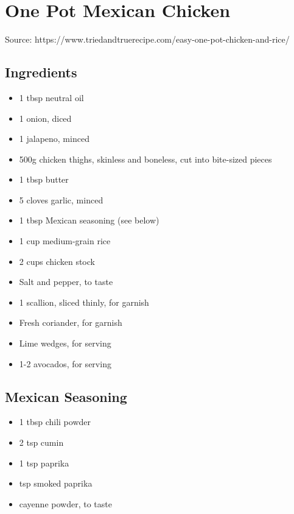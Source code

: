 \clearpage
\section{One Pot Mexican Chicken}


Source: https://www.triedandtruerecipe.com/easy-one-pot-chicken-and-rice/

\subsection{Ingredients}

\begin{itemize}
    \item 1 tbsp neutral oil
    \item 1 onion, diced
    \item 1 jalapeno, minced
    \item 500g chicken thighs, skinless and boneless, cut into bite-sized pieces
    \item 1 tbsp butter
    \item 5 cloves garlic, minced
    \item 1 tbsp Mexican seasoning (see below)
    \item 1 cup medium-grain rice
    \item 2 cups chicken stock
    \item Salt and pepper, to taste
    \item 1 scallion, sliced thinly, for garnish
    \item Fresh coriander, for garnish
    \item Lime wedges, for serving
    \item 1-2 avocados, for serving
\end{itemize}

\subsection{Mexican Seasoning}

\begin{itemize}
    \item 1 tbsp chili powder
    \item 2 tsp cumin
    \item 1 tsp paprika
    \item {} tsp smoked paprika
    \item cayenne powder, to taste
\end{itemize}

